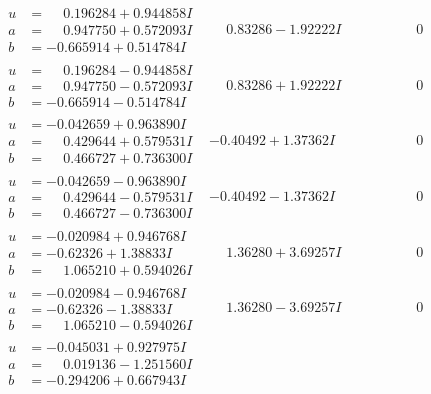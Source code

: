 \documentclass[1p]{elsarticle_modified}
\theoremstyle{definition}
\begin{document}
$$\begin{array}{c|c|c}
\begin{aligned}
u &= \phantom{-}0.196284 + 0.944858 I \\
a &= \phantom{-}0.947750 + 0.572093 I \\
b &= -0.665914 + 0.514784 I\end{aligned}
 & \phantom{-}0.83286 - 1.92222 I & \phantom{-0.000000 } 0 \\ \hline\begin{aligned}
u &= \phantom{-}0.196284 - 0.944858 I \\
a &= \phantom{-}0.947750 - 0.572093 I \\
b &= -0.665914 - 0.514784 I\end{aligned}
 & \phantom{-}0.83286 + 1.92222 I & \phantom{-0.000000 } 0 \\ \hline\begin{aligned}
u &= -0.042659 + 0.963890 I \\
a &= \phantom{-}0.429644 + 0.579531 I \\
b &= \phantom{-}0.466727 + 0.736300 I\end{aligned}
 & -0.40492 + 1.37362 I & \phantom{-0.000000 } 0 \\ \hline\begin{aligned}
u &= -0.042659 - 0.963890 I \\
a &= \phantom{-}0.429644 - 0.579531 I \\
b &= \phantom{-}0.466727 - 0.736300 I\end{aligned}
 & -0.40492 - 1.37362 I & \phantom{-0.000000 } 0 \\ \hline\begin{aligned}
u &= -0.020984 + 0.946768 I \\
a &= -0.62326 + 1.38833 I \\
b &= \phantom{-}1.065210 + 0.594026 I\end{aligned}
 & \phantom{-}1.36280 + 3.69257 I & \phantom{-0.000000 } 0 \\ \hline\begin{aligned}
u &= -0.020984 - 0.946768 I \\
a &= -0.62326 - 1.38833 I \\
b &= \phantom{-}1.065210 - 0.594026 I\end{aligned}
 & \phantom{-}1.36280 - 3.69257 I & \phantom{-0.000000 } 0 \\ \hline\begin{aligned}
u &= -0.045031 + 0.927975 I \\
a &= \phantom{-}0.019136 - 1.251560 I \\
b &= -0.294206 + 0.667943 I\end{aligned}

\end{array}$$
\end{document}
